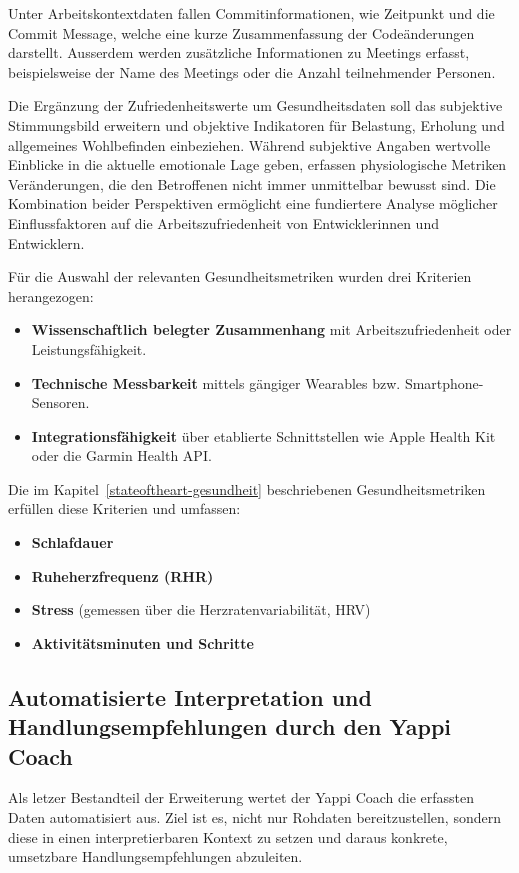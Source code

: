 \documentclass[12pt,a4paper]{report}
\begin{document}
Unter Arbeitskontextdaten fallen Commitinformationen, wie Zeitpunkt und die Commit Message, welche eine kurze Zusammenfassung der
Codeänderungen darstellt. Ausserdem werden zusätzliche Informationen zu Meetings erfasst, beispielsweise der Name des Meetings oder
die Anzahl teilnehmender Personen.

Die Ergänzung der Zufriedenheitswerte um Gesundheitsdaten soll das subjektive Stimmungsbild erweitern und objektive Indikatoren für
Belastung, Erholung und allgemeines Wohlbefinden einbeziehen. Während subjektive Angaben wertvolle Einblicke in die aktuelle
emotionale Lage geben, erfassen physiologische Metriken Veränderungen, die den Betroffenen nicht immer unmittelbar bewusst sind.
Die Kombination beider Perspektiven ermöglicht eine fundiertere Analyse möglicher Einflussfaktoren auf die Arbeitszufriedenheit
von Entwicklerinnen und Entwicklern.

Für die Auswahl der relevanten Gesundheitsmetriken wurden drei Kriterien herangezogen:

\begin{itemize}
  \item \textbf{Wissenschaftlich belegter Zusammenhang} mit Arbeitszufriedenheit oder Leistungsfähigkeit.
  \item \textbf{Technische Messbarkeit} mittels gängiger Wearables bzw. Smartphone-Sensoren.
  \item \textbf{Integrationsfähigkeit} über etablierte Schnittstellen wie Apple Health Kit oder die Garmin Health API.
\end{itemize}

Die im Kapitel~\ref{stateoftheart-gesundheit} beschriebenen Gesundheitsmetriken erfüllen diese Kriterien und umfassen:

\begin{itemize}
\item \textbf{Schlafdauer}
\item \textbf{Ruheherzfrequenz (RHR)}
\item \textbf{Stress} (gemessen über die Herzratenvariabilität, HRV)
\item \textbf{Aktivitätsminuten und Schritte}
\end{itemize}

\subsection{Automatisierte Interpretation und Handlungsempfehlungen durch den Yappi Coach}

Als letzer Bestandteil der Erweiterung wertet der Yappi Coach die erfassten Daten automatisiert aus. Ziel ist es, nicht nur 
Rohdaten bereitzustellen, sondern diese in einen interpretierbaren Kontext zu setzen und daraus konkrete, umsetzbare 
Handlungsempfehlungen abzuleiten.
\end{document}
